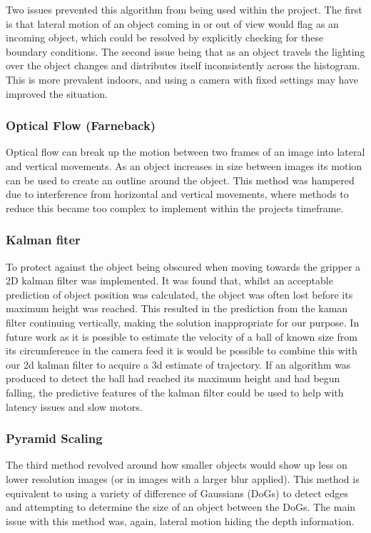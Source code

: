\documentclass[conference]{IEEEtran}
\begin{document}
	Two issues prevented this algorithm from being used within the project. The first is that lateral motion of an object coming in or out of view would flag as an incoming object, which could be resolved by explicitly checking for these boundary conditions. The second issue being that as an object travels the lighting over the object changes and distributes itself inconsistently across the histogram. This is more prevalent indoors, and using a camera with fixed settings may have improved the situation.
	
	\subsubsection{Optical Flow (Farneback)}
	Optical flow can break up the motion between two frames of an image into lateral and vertical movements. As an object increases in size between images its motion can be used to create an outline around the object. This method was hampered due to interference from horizontal and vertical movements, where methods to reduce this became too complex to implement within the projects timeframe.
	
	\subsubsection{Kalman fiter}
	To protect against the object being obscured when moving towards the gripper a 2D kalman filter was implemented. It was found that, whilst an acceptable prediction of object position was calculated, the object was often lost before its maximum height was reached. This resulted in the prediction from the kaman filter continuing vertically, making the solution inappropriate for our purpose. In future work as it is possible to estimate the velocity of a ball of known size from its circumference in the camera feed it is would be possible to combine this with our 2d kalman filter to acquire a 3d estimate of trajectory. If an algorithm was produced to detect the ball had reached its maximum height and had begun falling, the predictive features of the kalman filter could be used to help with latency issues and slow motors.
	
	\subsubsection{Pyramid Scaling}
	The third method revolved around how smaller objects would show up less on lower resolution images (or in images with a larger blur applied). This method is equivalent to using a variety of difference of Gaussians (DoGs) to detect edges and attempting to determine the size of an object between the DoGs. The main issue with this method was, again, lateral motion hiding the depth information.
	
\end{document}
